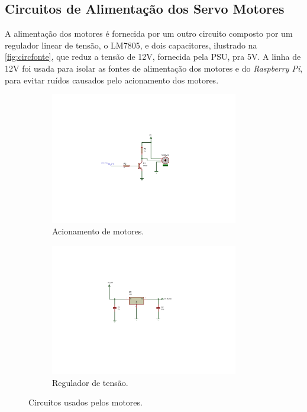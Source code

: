 \subsection{Circuitos de Alimentação dos Servo Motores}
\label{subsec:servomotorcircalimentacao}

A alimentação dos motores é fornecida por um outro circuito composto por um regulador linear de tensão, o LM7805, e dois capacitores, ilustrado na \autoref{fig:circfonte}, que reduz a tensão de 12V, fornecida pela PSU, pra 5V. A linha de 12V foi usada para isolar as fontes de alimentação dos motores e do \textit{Raspberry Pi}, para evitar ruídos causados pelo acionamento dos motores.

\begin{figure}[H]
	\centering
	\begin{subfigure}{.5\textwidth}
		\includegraphics[trim={6.5cm 5cm 9cm 5cm},clip,width=0.9\textwidth]{figuras/circ_acionamento.pdf}
		\caption{Acionamento de motores.}
		\label{fig:circprotecao}
	\end{subfigure}%
	\begin{subfigure}{.5\textwidth}
		\includegraphics[trim={6.5cm 5cm 8.5cm 4cm},clip,width=0.9\textwidth]{figuras/fonte_motores.pdf}
		\caption{Regulador de tensão.}
		\label{fig:circfonte}
	\end{subfigure}
	\caption{Circuitos usados pelos motores.}
\end{figure}

